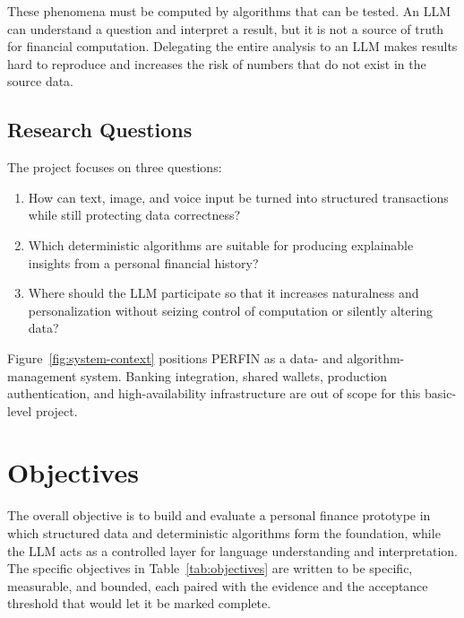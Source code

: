 These phenomena must be computed by algorithms that can be tested. An
LLM can understand a question and interpret a result, but it is not a
source of truth for financial computation. Delegating the entire
analysis to an LLM makes results hard to reproduce and increases the
risk of numbers that do not exist in the source data.

\subsection{Research Questions}

The project focuses on three questions:

\begin{enumerate}
  \item How can text, image, and voice input be turned into structured
  transactions while still protecting data correctness?
  \item Which deterministic algorithms are suitable for producing
  explainable insights from a personal financial history?
  \item Where should the LLM participate so that it increases
  naturalness and personalization without seizing control of computation
  or silently altering data?
\end{enumerate}


Figure~\ref{fig:system-context} positions PERFIN as a data- and
algorithm-management system. Banking integration, shared wallets,
production authentication, and high-availability infrastructure are out
of scope for this basic-level project.

\section{Objectives}

The overall objective is to build and evaluate a personal finance
prototype in which structured data and deterministic algorithms form the
foundation, while the LLM acts as a controlled layer for language
understanding and interpretation. The specific objectives in
Table~\ref{tab:objectives} are written to be specific, measurable, and
bounded, each paired with the evidence and the acceptance threshold that
would let it be marked complete.

